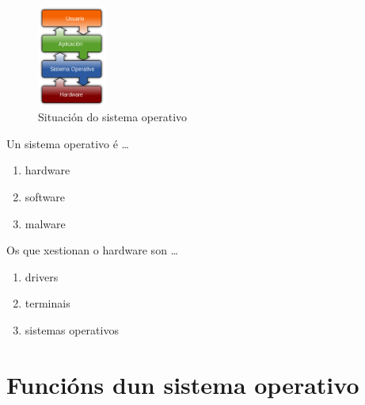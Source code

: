 
\begin{figure}
	\begin{center}
	\includegraphics[width=0.2\textwidth]{./debuxos/capas.png}
	 \caption{Situación do sistema operativo}
	 \end{center}
	 \label{capas}
\end{figure}

\begin{doublespace}

\end{doublespace}


\begin{diapo} \begin{frame}{Un sistema operativo é  \dots} 
\begin{enumerate}
\item hardware\pause
\item software \pause
\item malware 
\end{enumerate}
\end{frame} 
\end{diapo} 
\begin{diapo}\begin{frame}{Os que xestionan o hardware son  \dots}
\begin{enumerate}
\item drivers \pause
\item terminais \pause
\item sistemas operativos
\end{enumerate}
\end{frame}
\end{diapo}



\section{Funcións dun sistema operativo}


